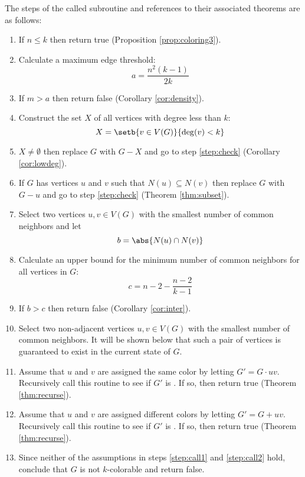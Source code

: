 The steps of the called subroutine and references to their associated theorems are as follows:

\begin{enumerate}
\item \label{step:check} If \(n\le k\) then return true (Proposition \ref{prop:coloring3}).

\item \label{step:dencalc} Calculate a maximum edge threshold:
  \[a=\frac{n^2(k-1)}{2k}\]

\item \label{step:density} If \(m>a\) then return false (Corollary \ref{cor:density}).

\item \label{step:smallcalc} Construct the set \(X\) of all vertices with degree less than \(k\):
  \[X=\setb{v\in V(G)}{\deg(v)<k}\]

\item \label{step:small} \(X\ne\emptyset\) then replace \(G\) with \(G-X\) and go to step \ref{step:check}
  (Corollary \ref{cor:lowdeg}).

\item \label{step:neighbor} If \(G\) has vertices \(u\) and \(v\) such that \(N(u)\subseteq N(v)\) then replace
  \(G\) with \(G-u\) and go to step \ref{step:check} (Theorem \ref{thm:subset}).

\item \label{step:select} Select two vertices \(u,v\in V(G)\) with the smallest number of common neighbors and let
  \[b=\abs{N(u)\cap N(v)}\]

\item \label{step:neighcalc} Calculate an upper bound for the minimum number of common neighbors for all vertices
  in \(G\):
  \[c=n-2-\frac{n-2}{k-1}\]

\item \label{step:common} If \(b>c\) then return false (Corollary \ref{cor:inter}).

\item \label{step:select2} Select two non-adjacent vertices \(u,v\in V(G)\) with the smallest number of common
  neighbors.  It will be shown below that such a pair of vertices is guaranteed to exist in the current state of
  \(G\).

\item \label{step:call1} Assume that \(u\) and \(v\) are assigned the same color by letting \(G'=G\cdot uv\).
  Recursively call this routine to see if \(G'\) is .  If so, then return true (Theorem
  \ref{thm:recurse}).

\item \label{step:call2} Assume that \(u\) and \(v\) are assigned different colors by letting \(G'=G+uv\).
  Recursively call this routine to see if \(G'\) is .  If so, then return true (Theorem
  \ref{thm:recurse}).

\item \label{step:fail} Since neither of the assumptions in steps \ref{step:call1} and \ref{step:call2} hold,
  conclude that \(G\) is not \(k\)-colorable and return false.
\end{enumerate}

